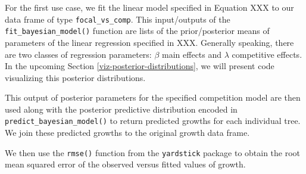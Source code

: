 \documentclass[12pt]{article}
\newenvironment{Shaded}{\begin{snugshade}}{\end{snugshade}}
\newcommand{\CommentTok}[1]{\textcolor[rgb]{0.56,0.35,0.01}{\textit{#1}}}
\newcommand{\DataTypeTok}[1]{\textcolor[rgb]{0.13,0.29,0.53}{#1}}
\newcommand{\KeywordTok}[1]{\textcolor[rgb]{0.13,0.29,0.53}{\textbf{#1}}}
\newcommand{\NormalTok}[1]{#1}
\newcommand{\OperatorTok}[1]{\textcolor[rgb]{0.81,0.36,0.00}{\textbf{#1}}}
\newcommand{\OtherTok}[1]{\textcolor[rgb]{0.56,0.35,0.01}{#1}}
\newcommand{\StringTok}[1]{\textcolor[rgb]{0.31,0.60,0.02}{#1}}
\begin{document}
For the first use case, we fit the linear model specified in Equation
XXX to our data frame of type \texttt{focal\_vs\_comp}. This
input/outputs of the \texttt{fit\_bayesian\_model()} function are lists
of the prior/posterior means of parameters of the linear regression
specified in XXX. Generally speaking, there are two classes of
regression parameters: \(\beta\) main effects and \(\lambda\)
competitive effects. In the upcoming Section
\ref{viz-posterior-distributions}, we will present code visualizing this
posterior distributions.

\begin{Shaded}
\end{Shaded}

This output of posterior parameters for the specified competition model
are then used along with the posterior predictive distribution encoded
in \texttt{predict\_bayesian\_model()} to return predicted growths for
each individual tree. We join these predicted growths to the original
growth data frame.

\begin{Shaded}
\end{Shaded}

We then use the \texttt{rmse()} function from the \texttt{yardstick}
package to obtain the root mean squared error of the observed versus
fitted values of growth.

\begin{Shaded}
\end{Shaded}
\end{document}
